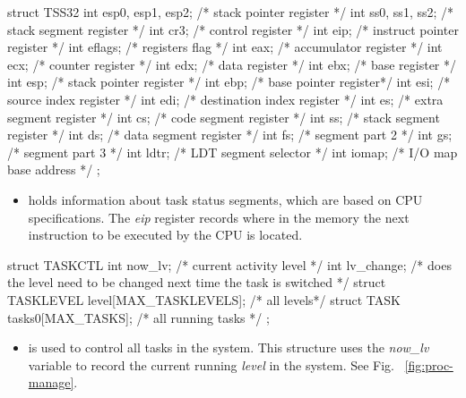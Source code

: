 \documentclass{swfcthesis}
\begin{document}
\begin{codeblock}[1]
\begin{ccode}
struct TSS32
{ 
  int esp0, esp1, esp2; /* stack pointer register */
  int ss0, ss1, ss2;    /* stack segment register */
  int cr3;    /* control register */
  int eip;    /* instruct pointer register */
  int eflags; /* registers flag */
  int eax;    /* accumulator register */
  int ecx;    /* counter register */
  int edx;    /* data register */
  int ebx;    /* base register */
  int esp;    /* stack pointer register */
  int ebp;    /* base pointer register*/
  int esi;    /* source index register */
  int edi;    /* destination index register */
  int es;     /* extra segment register */
  int cs;     /* code segment register */
  int ss;     /* stack segment register */
  int ds;     /* data segment register */
  int fs;     /* segment part 2 */
  int gs;     /* segment part 3 */
  int ldtr;   /* LDT segment selector */
  int iomap;  /* I/O map base address */
};
\end{ccode}
\end{codeblock}
\begin{itemize}
\item holds information about task status segments, which are based on CPU
  specifications\cite[Sec.6.2.1]{intel_3a}. The \emph{eip} register records where in the
  memory the next instruction to be executed by the CPU is located.
\end{itemize}

\begin{codeblock}[1]
\begin{ccode}
struct TASKCTL
{ 
  int now_lv;    /* current activity level */
  int lv_change; /* does the level need to be changed next time the task is switched */
  struct TASKLEVEL level[MAX_TASKLEVELS]; /* all levels*/
  struct TASK tasks0[MAX_TASKS];          /* all running tasks */
};
\end{ccode}
\end{codeblock}
\begin{itemize}
\item is used to control all tasks in the system. This structure uses the \emph{now\_lv}
  variable to record the current running \emph{level} in the system. See
  Fig. ~\ref{fig:proc-manage}.
  
  
\end{itemize}
\end{document}
